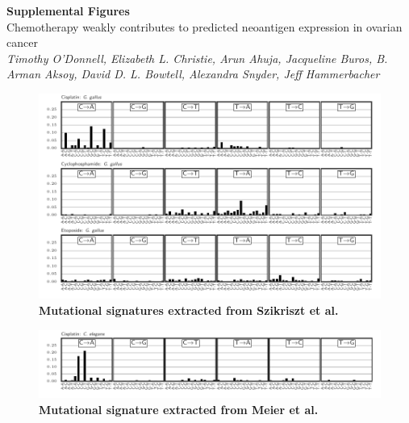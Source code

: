 \documentclass{article}
\begin{document}
\begin{titlepage}
   \begin{center}
      \Large\textbf{Supplemental Figures}\\
      \vspace{1em}
      \Large{Chemotherapy weakly contributes to predicted neoantigen expression in ovarian cancer} \\
      \vspace{1em}
     \large\textit{Timothy O'Donnell, Elizabeth L. Christie, Arun Ahuja, Jacqueline Buros, B. Arman Aksoy, David D. L. Bowtell, Alexandra Snyder, Jeff Hammerbacher}
   \end{center}
\end{titlepage}

\setcounter{equation}{0}
\setcounter{figure}{0}
\setcounter{table}{0}
\makeatletter
\renewcommand{\theequation}{S\arabic{equation}}
\renewcommand{\thefigure}{S\arabic{figure}}

\begin{figure}
\centering
\includegraphics[scale=1.0]{../figures/extracted_signatures_chicken.pdf}
\caption{\textbf{Mutational signatures extracted from Szikriszt et al.}~\cite{Szikriszt_2016}}
\label{fig:supp_extracted_signatures_chicken}
\end{figure}

\begin{figure}
\centering
\includegraphics[scale=1.0]{../figures/extracted_signatures_worm.pdf}
\caption{\textbf{Mutational signature extracted from Meier et al.}~\cite{Meier_2014}}
\label{fig:supp_extracted_signatures_worm}
\end{figure}
\end{document}

